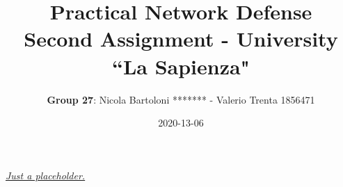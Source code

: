 \documentclass[letterpaper,11pt]{article}
\begin{document}
\title{\textbf{Practical Network Defense}\\ \bigskip \large Second Assignment - University ``La Sapienza"}
\date{2020-13-06}
\author{\textbf{Group 27}: Nicola Bartoloni ******* - Valerio Trenta 1856471}
\maketitle


\newpage

\newpage

\newpage

\newpage

\newpage

\newpage

\begin{thebibliography}{9}
\href{https://web.cs.hacettepe.edu.tr/~aykut/classes/spring2013/bil682/supplemental/outlierbook.pdf}{\em Just a placeholder.}
\end{thebibliography}
\end{document}
